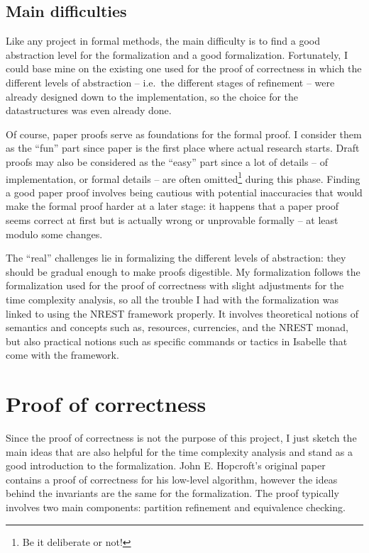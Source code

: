 \documentclass[12pt, a4 paper]{article}
\theoremstyle{definition}
\begin{document}
\subsection{Main difficulties}

Like any project in formal methods, the main difficulty is to find a good abstraction level for the formalization and a good formalization. Fortunately, I could base mine on the existing one used for the proof of correctness in which the different levels of abstraction -- i.e.\ the different stages of refinement -- were already designed down to the implementation, so the choice for the datastructures was even already done.

Of course, paper proofs serve as foundations for the formal proof. I consider them as the ``fun'' part since paper is the first place where actual research starts. Draft proofs may also be considered as the ``easy'' part since a lot of details -- of implementation, or formal details -- are often omitted\footnote{Be it deliberate or not!} during this phase. Finding a good paper proof involves being cautious with potential inaccuracies that would make the formal proof harder at a later stage: it happens that a paper proof seems correct at first but is actually wrong or unprovable formally -- at least modulo some changes.

The ``real'' challenges lie in formalizing the different levels of abstraction: they should be gradual enough to make proofs digestible. My formalization follows the formalization used for the proof of correctness with slight adjustments for the time complexity analysis, so all the trouble I had with the formalization was linked to using the NREST framework properly. It involves theoretical notions of semantics and concepts such as, resources, currencies, and the NREST monad, but also practical notions such as specific commands or tactics in Isabelle that come with the framework.


\section{Proof of correctness}

Since the proof of correctness is not the purpose of this project, I just sketch the main ideas that are also helpful for the time complexity analysis and stand as a good introduction to the formalization.
John E. Hopcroft's original paper \cite{Hop71} contains a proof of correctness for his low-level algorithm, however the ideas behind the invariants are the same for the formalization.
The proof typically involves two main components: partition refinement and equivalence checking.
\end{document}
